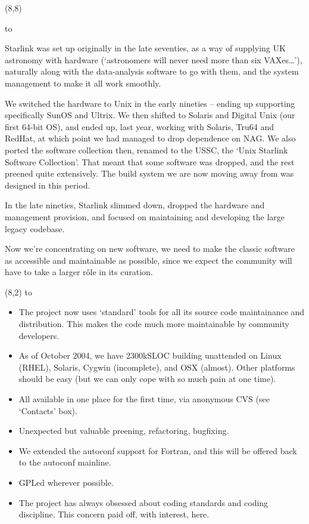 \documentclass[a0,portrait]{a0poster-ng}
\def\RHead#1{\noindent\hbox to \hsize{\hfil{\LARGE\color{DarkBlue} #1\par}}\bigskip}
\let\Head\RHead
\def\RHead#1{\noindent\hbox to \hsize{\hfil{\huge\color{DarkBlue} #1\par}}\bigskip}
\let\Head\RHead
\newcommand{\autoconf}{{\ttfamily\small autoconf}}
\newcommand{\autoconf}{{\ttfamily\normalsize autoconf}}
\begin{document}
\begin{textblock}{7}(8,8)

\Head{History}

Starlink was set up originally in the late seventies, as a way of
supplying UK astronomy with hardware (`astronomers will never need
more than six VAXes\dots'), naturally along with the data-analysis
software to go with them, and the system management to make it all
work smoothly.

We switched the hardware to Unix in the early nineties -- ending up
supporting specifically SunOS and Ultrix.  We then shifted to Solaris
and Digital Unix (our first 64-bit OS), and ended up, last year,
working with Solaris, Tru64 and RedHat, at which point we had managed
to drop dependence on NAG.  We also ported the software
collection then, renamed to the USSC, the `Unix Starlink Software
Collection'.  That meant that some software was dropped, and the rest
preened quite extensively.  The build system we are now moving away
from was designed in this period.

In the late nineties, Starlink slimmed down, dropped the hardware and
management provision, and focused on maintaining and developing the
large legacy codebase.

Now we're concentrating on new software, we need to make the classic
software as accessible and maintainable as possible, since we expect
the community will have to take a larger r\^ole in its curation.

\end{textblock}


\begin{textblock}{7}(8,2)
\Head{The Outcome}

\begin{itemize}
\item The project now uses `standard' tools for all its source code
  maintainance and distribution.  This makes the code much more
  maintainable by community developers.

\item As of October 2004, we have 2300kSLOC building unattended on
  Linux (RHEL), Solaris, Cygwin (incomplete), and OSX (almost).  Other
  platforms should be easy (but we can only cope with so much pain at
  one time).

\item All available in one place for the first time, via anonymous CVS
  (see `Contacts' box).

\item Unexpected but valuable preening, refactoring, bugfixing.

\item We extended the \autoconf{} support for Fortran, and this will be
  offered back to the \autoconf{} mainline.

\item GPLed wherever possible.

\item The project has always obsessed about coding standards and
  coding discipline.  This concern paid off, with interest, here.

\end{itemize}  
\end{textblock}
\end{document}
